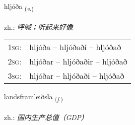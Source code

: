 \documentclass[frontgrid, backgrid]{flacards}\usepackage[]{graphicx}\usepackage[]{xcolor}
\begin{document}
\renewcommand{\flhead}{\vskip5pt \fboxsep=0pt {\small\bfseries\footnotesize Sagnorð | 动词}}
\renewcommand{\fcfoot}{\vskip5pt \fboxsep=0pt \hspace{2pt}{\small\bfseries\footnotesize 3K}}

\renewcommand{\blhead}{\vskip5pt {\small\bfseries\footnotesize Sagnorð | 动词 }}
\renewcommand{\bcfoot}{\vskip5pt \hspace{2pt}{\small\bfseries\footnotesize 3K}}


{hljóða \small{\textsubscript{(\textit{v.})}} \\[1ex] %
\textphonetic{[l̥jouːða]} \\
zh.: \emph{呼喊；听起来好像} \\  [2ex]
\renewcommand*{\arraystretch}{0.8}
\begin{tabular}{p{1cm}l}
\textsc{1sg}: & hljóða -- hljóðaði -- hljóðað \\ 
\textsc{2sg}: & hljóðar -- hljóðaðir -- hljóðað \\ 
\textsc{3sg}: & hljóðar -- hljóðaði -- hljóðað \\ 
\end{tabular}
}

\renewcommand{\flhead}{\vskip5pt \fboxsep=0pt {\small\bfseries\footnotesize Nafnorð | 名词}}
\renewcommand{\fcfoot}{\vskip5pt \fboxsep=0pt \hspace{2pt}{\small\bfseries\footnotesize 3K}}

\renewcommand{\blhead}{\vskip5pt {\small\bfseries\footnotesize Nafnorð | 名词 }}
\renewcommand{\bcfoot}{\vskip5pt \hspace{2pt}{\small\bfseries\footnotesize 3K}}


{landsframleiðsla \small{\textsubscript{(\textit{f.})}} \\[1ex] %
\textphonetic{[lantsframleiðstla]} \\
zh.: \emph{国内生产总值（GDP）} \\  [2ex]
\renewcommand*{\arraystretch}{0.8}
}
\end{document}
